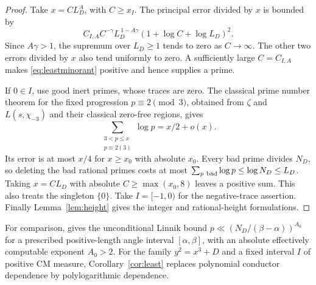 \documentclass[11pt,a4paper]{article}
\numberwithin{equation}{section}
\theoremstyle{definition}
\theoremstyle{remark}
\begin{document}
\begin{proof}
Take $x=C L_D^A$, with $C\ge x_I$. The principal error divided by $x$ is bounded by
\[
 C_{I,A}C^{-\gamma}L_D^{\,1-A\gamma}
       (1+\log C+\log L_D)^2.
\]
Since $A\gamma>1$, the supremum over $L_D\ge1$ tends to zero as $C\to\infty$. The other two errors divided by $x$ also tend uniformly to zero. A sufficiently large $C=C_{I,A}$ makes \eqref{eq:leastminorant} positive and hence supplies a prime.

If $0\in I$, use good inert primes, whose traces are zero. The classical prime number theorem for the fixed progression $p\equiv2\pmod3$, obtained from $\zeta$ and $L(s,\chi_{-3})$ and their classical zero-free regions, gives
\[
 \sum_{\substack{3<p\le x\\p\equiv2(3)}}\log p=x/2+o(x).
\]
Its error is at most $x/4$ for $x\ge x_0$ with absolute $x_0$. Every bad prime divides $N_D$, so deleting the bad rational primes costs at most $\sum_{p\ {\rm bad}}\log p\le\log N_D\le L_D$. Taking $x=C L_D$ with absolute $C\ge\max(x_0,8)$ leaves a positive sum. This also treats the singleton $\{0\}$. Take $I=[-1,0)$ for the negative-trace assertion. Finally Lemma~\ref{lem:height} gives the integer and rational-height formulations.
\end{proof}

For comparison, \cite[Theorem 1.1]{CPS} gives the unconditional Linnik bound $p\ll(N_D/(\beta-\alpha))^{A_0}$ for a prescribed positive-length angle interval $[\alpha,\beta]$, with an absolute effectively computable exponent $A_0>2$. For the family $y^2=x^3+D$ and a fixed interval $I$ of positive CM measure, Corollary~\ref{cor:least} replaces polynomial conductor dependence by polylogarithmic dependence.
\end{document}
